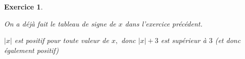 \documentclass[10pt]{article}
\newtheorem{exo}{Exercice}
\begin{document}
\begin{exo}
\begin{enumerate}
\begin{multicols}{2}
On a déjà fait le tableau de signe de $x$ dans l'exercice précédent.

\columnbreak

$|x|$ est positif pour toute valeur de $x,$ donc $|x|+3$ est supérieur à $3$ (et donc également positif)

\end{multicols}

\medskip



\begin{center}
\end{center}

\end{enumerate}
\end{exo}
\end{document}
